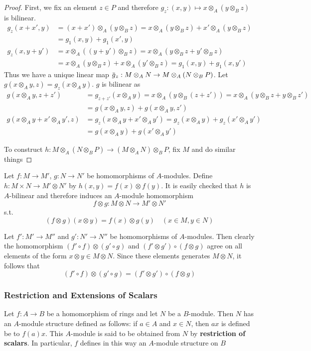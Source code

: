 \documentclass[11pt]{article}
\begin{document}
\begin{proof}
First, we fix an element \(z\in P\) and therefore \(g_z:(x,y)\mapsto x\otimes_A(y\otimes_Bz)\) is bilinear.
\begin{align*}
g_z(x+x',y)&=(x+x')\otimes_A(y\otimes_Bz)=x\otimes_A(y\otimes_Bz)+x'\otimes_A(y\otimes_Bz)\\&=g_1(x,y)+g_1(x',y)\\
g_z(x,y+y')&=x\otimes_A((y+y')\otimes_Bz)=x\otimes_A(y\otimes_Bz+y'\otimes_Bz)\\&=x\otimes_A(y\otimes_Bz)+x\otimes_A(y'\otimes_Bz)=g_1(x,y)+g_1(x,y')
\end{align*}
Thus we have a unique linear map \(\barg_z:M\otimes_AN\to M\otimes_A(N\otimes_BP)\). Let
\(g(x\otimes_Ay,z)=g_z(x\otimes_Ay)\). \(g\) is bilinear as
\begin{align*}
g(x\otimes_Ay,z+z')&=g_{z+z'}(x\otimes_Ay)=x\otimes_A(y\otimes_B(z+z'))=x\otimes_A(y\otimes_Bz+y\otimes_Bz')\\
&=g(x\otimes_Ay,z)+g(x\otimes_Ay,z')\\
g(x\otimes_Ay+x'\otimes_Ay',z)&=g_z(x\otimes_Ay+x'\otimes_Ay')=g_z(x\otimes_Ay)+g_z(x'\otimes_Ay')\\
&=g(x\otimes_Ay)+g(x'\otimes_Ay')
\end{align*}

To construct \(h:M\otimes_A(N\otimes_BP)\to(M\otimes_AN)\otimes_BP\), fix \(M\) and do similar things
\end{proof}

Let \(f:M\to M'\), \(g:N\to N'\) be homomorphisms of \(A\)-modules. Define \(h:M\times N\to M'\otimes N'\)
by \(h(x,y)=f(x)\otimes f(y)\). It is easily checked that \(h\) is \(A\)-bilinear and therefore
induces an \(A\)-module homomorphism
\begin{equation*}
f\otimes g:M\otimes N\to M'\otimes N'
\end{equation*}
s.t.
\begin{equation*}
(f\otimes g)(x\otimes y)=f(x)\otimes g(y)\quad(x\in M,y\in N)
\end{equation*}


Let \(f':M'\to M''\) and \(g':N'\to N''\) be homomorphisms of \(A\)-modules. Then clearly the
homomorphism \((f'\circ f)\otimes(g'\circ g)\) and \((f'\otimes g')\circ(f\otimes g)\) agree on all elements of the
form \(x\otimes y\in M\otimes N\). Since these elements generates \(M\otimes N\), it follows that
\begin{equation*}
(f'\circ f)\otimes(g'\circ g)=(f'\otimes g')\circ(f\otimes g)
\end{equation*}
\subsubsection*{Restriction and Extensions of Scalars}
\label{sec:org440f7a7}
Let \(f:A\to B\) be a homomorphism of rings and let \(N\) be a \(B\)-module. Then \(N\) has
an \(A\)-module structure defined as follows: if \(a\in A\) and \(x\in N\), then \(ax\) is defined
be to \(f(a)x\). This \(A\)-module is said to be obtained from \(N\) by \textbf{restriction of scalars}.
In particular, \(f\) defines in this way an \(A\)-module structure on \(B\)
\end{document}
